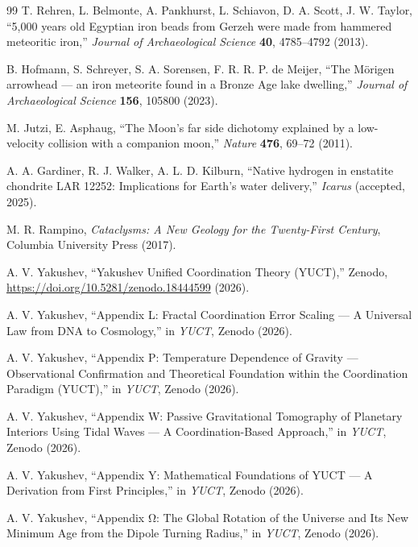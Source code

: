 \documentclass[12pt,a4paper]{article}
\begin{document}
\begin{thebibliography}{99}
		T. Rehren, L. Belmonte, A. Pankhurst, L. Schiavon, D. A. Scott, J. W. Taylor, ``5,000 years old Egyptian iron beads from Gerzeh were made from hammered meteoritic iron,''
		\emph{Journal of Archaeological Science} \textbf{40}, 4785–4792 (2013).
		
		B. Hofmann, S. Schreyer, S. A. Sorensen, F. R. R. P. de Meijer, ``The Mörigen arrowhead — an iron meteorite found in a Bronze Age lake dwelling,''
		\emph{Journal of Archaeological Science} \textbf{156}, 105800 (2023).
		
		M. Jutzi, E. Asphaug, ``The Moon's far side dichotomy explained by a low-velocity collision with a companion moon,''
		\emph{Nature} \textbf{476}, 69–72 (2011).
		
		A. A. Gardiner, R. J. Walker, A. L. D. Kilburn, ``Native hydrogen in enstatite chondrite LAR 12252: Implications for Earth's water delivery,''
		\emph{Icarus} (accepted, 2025).
		
		M. R. Rampino, \emph{Cataclysms: A New Geology for the Twenty-First Century},
		Columbia University Press (2017).
		
		A. V. Yakushev, ``Yakushev Unified Coordination Theory (YUCT),''
		Zenodo, \url{https://doi.org/10.5281/zenodo.18444599} (2026).
		
		A. V. Yakushev, ``Appendix L: Fractal Coordination Error Scaling — A Universal Law from DNA to Cosmology,''
		in \emph{YUCT}, Zenodo (2026).
		
		A. V. Yakushev, ``Appendix P: Temperature Dependence of Gravity — Observational Confirmation and Theoretical Foundation within the Coordination Paradigm (YUCT),''
		in \emph{YUCT}, Zenodo (2026).
		
		A. V. Yakushev, ``Appendix W: Passive Gravitational Tomography of Planetary Interiors Using Tidal Waves — A Coordination-Based Approach,''
		in \emph{YUCT}, Zenodo (2026).
		
		A. V. Yakushev, ``Appendix Y: Mathematical Foundations of YUCT — A Derivation from First Principles,''
		in \emph{YUCT}, Zenodo (2026).
		
		A. V. Yakushev, ``Appendix Ω: The Global Rotation of the Universe and Its New Minimum Age from the Dipole Turning Radius,''
		in \emph{YUCT}, Zenodo (2026).
		

\end{thebibliography}
\end{document}
